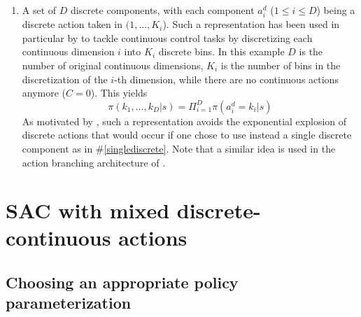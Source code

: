 \documentclass[letterpaper]{article} \usepackage{aaai20}  \usepackage{times}  \usepackage{helvet} \usepackage{courier}  \usepackage[hyphens]{url}  \usepackage{graphicx} \urlstyle{rm} \def\UrlFont{\rm}  \usepackage{graphicx}  \usepackage[section]{placeins}
\newcommand{\citet}{\cite}  \newcommand{\citep}{\cite} \DeclareMathOperator*{\softmax}{softmax}
\begin{document}
\begin{enumerate}
    \item A set of $D$ discrete components, with each component $a^d_i$ ($1 \leq i \leq D$) being a discrete action taken in $(1, \ldots, K_i$). Such a representation has been used in particular by \citet{tang2019} to tackle continuous control tasks by discretizing each continuous dimension $i$ into $K_i$ discrete bins.
    In this example $D$ is the number of original continuous dimensions, $K_i$ is the number of bins in the discretization of the $i$-th dimension, while there are no continuous actions anymore ($C = 0$).
    This yields $$\pi(k_1, \ldots, k_D | s) = \Pi_{i=1}^D \pi(a^d_i = k_i | s)$$
    As motivated by \citet{tang2019}, such a representation avoids the exponential explosion of discrete actions that would occur if one chose to use instead a single discrete component as in \#\ref{singlediscrete}.
    Note that a similar idea is used in the action branching architecture of \citet{tavakoli2018}.

\end{enumerate}

\section{SAC with mixed discrete-continuous actions}

\subsection{Choosing an appropriate policy parameterization}
\end{document}
